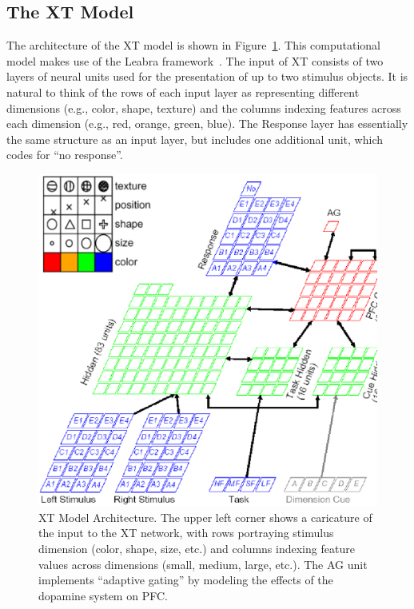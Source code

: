 \subsection{The XT Model} 


The architecture of the XT model is shown in Figure~\ref{xt-layout-figure}.  This computational model makes use of the Leabra framework~\cite{OReillyRC:2000:Computational}.  The input of XT consists of two layers of neural units used for the presentation of up to two stimulus objects.  It is natural to think of the rows of each input layer as representing different dimensions (e.g., color, shape, texture) and the columns indexing features across each dimension (e.g., red, orange, green, blue).  The Response layer has essentially the same structure as an input layer, but includes one additional unit, which codes for ``no response''.  

\begin{figure}
\begin{center}
	\includegraphics[width=125mm]{figures/xt_arch_2.ps}
\end{center}
\caption{XT Model Architecture.  The upper left corner shows a
         caricature of the input to the XT network, with rows
         portraying stimulus dimension (color, shape, size, etc.) and
         columns indexing feature values across dimensions (small,
         medium, large, etc.).  The AG unit implements ``adaptive gating'' 
	 by modeling the effects of the dopamine system on PFC.}
\label{xt-layout-figure}
\end{figure} 

